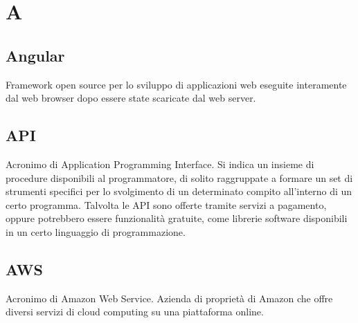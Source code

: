 \section*{A}
\markright{}
\subsection*{Angular}
Framework open source per lo sviluppo di applicazioni web eseguite interamente dal web browser dopo essere state scaricate dal web server.
\subsection*{API}
Acronimo di Application Programming Interface. Si indica un  insieme  di  procedure disponibili al programmatore, di solito  raggruppate a formare un set di strumenti specifici per lo svolgimento di un determinato compito all’interno di un certo programma. Talvolta le API sono offerte tramite servizi a pagamento, oppure potrebbero essere funzionalità gratuite, come librerie software disponibili in un certo linguaggio di programmazione.
\subsection*{AWS}
Acronimo di Amazon Web Service. Azienda di proprietà di Amazon che offre diversi servizi di cloud computing su una piattaforma online.

